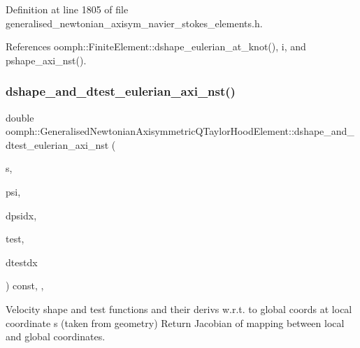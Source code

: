 Definition at line 1805 of file generalised\+\_\+newtonian\+\_\+axisym\+\_\+navier\+\_\+stokes\+\_\+elements.\+h.



References oomph\+::\+Finite\+Element\+::dshape\+\_\+eulerian\+\_\+at\+\_\+knot(), i, and pshape\+\_\+axi\+\_\+nst().

\mbox{\label{classoomph_1_1GeneralisedNewtonianAxisymmetricQTaylorHoodElement_ab06548cfe44cf1ca0bec7ef66713aef2}} 
\subsubsection{\texorpdfstring{dshape\+\_\+and\+\_\+dtest\+\_\+eulerian\+\_\+axi\+\_\+nst()}{dshape\_and\_dtest\_eulerian\_axi\_nst()}}
{\footnotesize\ttfamily double oomph\+::\+Generalised\+Newtonian\+Axisymmetric\+Q\+Taylor\+Hood\+Element\+::dshape\+\_\+and\+\_\+dtest\+\_\+eulerian\+\_\+axi\+\_\+nst (\begin{DoxyParamCaption}\item[{const \hyperlink{classoomph_1_1Vector}{Vector}$<$ double $>$ \&}]{s,  }\item[{\hyperlink{classoomph_1_1Shape}{Shape} \&}]{psi,  }\item[{\hyperlink{classoomph_1_1DShape}{D\+Shape} \&}]{dpsidx,  }\item[{\hyperlink{classoomph_1_1Shape}{Shape} \&}]{test,  }\item[{\hyperlink{classoomph_1_1DShape}{D\+Shape} \&}]{dtestdx }\end{DoxyParamCaption}) const\hspace{0.3cm}{\ttfamily [inline]}, {\ttfamily [protected]}, {\ttfamily [virtual]}}



Velocity shape and test functions and their derivs w.\+r.\+t. to global coords at local coordinate s (taken from geometry) Return Jacobian of mapping between local and global coordinates. 

